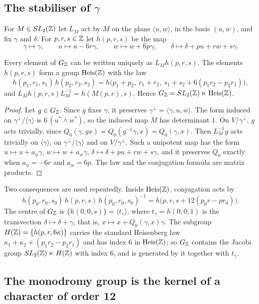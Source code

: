 \subsection{The stabiliser of \texorpdfstring{$\gamma$}{gamma}}

For $M\in SL_2(\mathbb{Z})$ let $L_M$ act by $M$ on the plane $\langle u,w\rangle$, in the basis $(u,w)$, and fix $\gamma$ and $\delta$. For $p,r,s\in\mathbb{Z}$ let $h(p,r,s)$ be the map
\[
\gamma\mapsto\gamma,\qquad u\mapsto u-6r\gamma,\qquad w\mapsto w+6p\gamma,\qquad \delta\mapsto\delta+pu+rw+s\gamma.
\]

\begin{lemma}\label{lem:stab}
Every element of $G_{\mathbb{Z}}$ can be written uniquely as $L_Mh(p,r,s)$. The elements $h(p,r,s)$ form a group $\mathrm{Heis}(\mathbb{Z})$ with the law
\[
h(p_1,r_1,s_1)\,h(p_2,r_2,s_2)=h\bigl(p_1+p_2,\ r_1+r_2,\ s_1+s_2+6(p_1r_2-p_2r_1)\bigr),
\]
and $L_Mh(p,r,s)L_M^{-1}=h(M(p,r),s)$. Hence $G_{\mathbb{Z}}=SL_2(\mathbb{Z})\ltimes\mathrm{Heis}(\mathbb{Z})$.
\end{lemma}
\begin{proof}
Let $g\in G_{\mathbb{Z}}$. Since $g$ fixes $\gamma$, it preserves $\gamma^\perp=\langle\gamma,u,w\rangle$. The form induced on $\gamma^\perp/\langle\gamma\rangle$ is $6\,(u^*\wedge w^*)$, so the induced map $M$ has determinant $1$. On $V/\gamma^\perp$, $g$ acts trivially, since $Q_0(\gamma,gx)=Q_0(g^{-1}\gamma,x)=Q_0(\gamma,x)$. Then $L_M^{-1}g$ acts trivially on $\langle\gamma\rangle$, on $\gamma^\perp/\langle\gamma\rangle$ and on $V/\gamma^\perp$. Such a unipotent map has the form $u\mapsto u+a_u\gamma$, $w\mapsto w+a_w\gamma$, $\delta\mapsto\delta+pu+rw+s\gamma$, and it preserves $Q_0$ exactly when $a_u=-6r$ and $a_w=6p$. The law and the conjugation formula are matrix products.
\end{proof}

Two consequences are used repeatedly. Inside $\mathrm{Heis}(\mathbb{Z})$, conjugation acts by
\[
h(p_0,r_0,s_0)\,h(p,r,s)\,h(p_0,r_0,s_0)^{-1}=h\bigl(p,r,s+12(p_0r-pr_0)\bigr).
\] The centre of $G_{\mathbb{Z}}$ is $\{h(0,0,s)\}=\langle t_\gamma\rangle$, where $t_\gamma=h(0,0,1)$ is the transvection $\delta\mapsto\delta+\gamma$, that is, $x\mapsto x+Q_0(\gamma,x)\gamma$. The subgroup $H(\mathbb{Z})=\{h(p,r,6\kappa)\}$ carries the standard Heisenberg law $\kappa_1+\kappa_2+(p_1r_2-p_2r_1)$ and has index $6$ in $\mathrm{Heis}(\mathbb{Z})$; so $G_{\mathbb{Z}}$ contains the Jacobi group $SL_2(\mathbb{Z})\ltimes H(\mathbb{Z})$ with index $6$, and is generated by it together with $t_\gamma$.

\subsection{The monodromy group is the kernel of a character of order 12}

